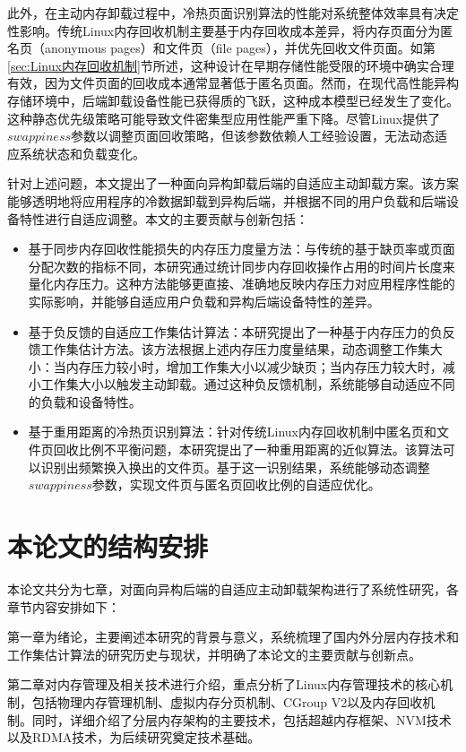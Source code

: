 此外，在主动内存卸载过程中，冷热页面识别算法的性能对系统整体效率具有决定性影响。传统Linux内存回收机制主要基于内存回收成本差异，将内存页面分为匿名页（anonymous pages）和文件页（file pages），并优先回收文件页面。如第\ref{sec:Linux内存回收机制}节所述，这种设计在早期存储性能受限的环境中确实合理有效，因为文件页面的回收成本通常显著低于匿名页面。然而，在现代高性能异构存储环境中，后端卸载设备性能已获得质的飞跃，这种成本模型已经发生了变化。这种静态优先级策略可能导致文件密集型应用性能严重下降。尽管Linux提供了\(swappiness\)参数以调整页面回收策略，但该参数依赖人工经验设置，无法动态适应系统状态和负载变化。

针对上述问题，本文提出了一种面向异构卸载后端的自适应主动卸载方案。该方案能够透明地将应用程序的冷数据卸载到异构后端，并根据不同的用户负载和后端设备特性进行自适应调整。本文的主要贡献与创新包括：

\begin{itemize}
    \item 基于同步内存回收性能损失的内存压力度量方法：与传统的基于缺页率或页面分配次数的指标不同，本研究通过统计同步内存回收操作占用的时间片长度来量化内存压力。这种方法能够更直接、准确地反映内存压力对应用程序性能的实际影响，并能够自适应用户负载和异构后端设备特性的差异。
    \item 基于负反馈的自适应工作集估计算法：本研究提出了一种基于内存压力的负反馈工作集估计方法。该方法根据上述内存压力度量结果，动态调整工作集大小：当内存压力较小时，增加工作集大小以减少缺页；当内存压力较大时，减小工作集大小以触发主动卸载。通过这种负反馈机制，系统能够自动适应不同的负载和设备特性。
    \item 基于重用距离的冷热页识别算法：针对传统Linux内存回收机制中匿名页和文件页回收比例不平衡问题，本研究提出了一种重用距离的近似算法。该算法可以识别出频繁换入换出的文件页。基于这一识别结果，系统能够动态调整\(swappiness\)参数，实现文件页与匿名页回收比例的自适应优化。
\end{itemize}

\section{本论文的结构安排}

本论文共分为七章，对面向异构后端的自适应主动卸载架构进行了系统性研究，各章节内容安排如下：

第一章为绪论，主要阐述本研究的背景与意义，系统梳理了国内外分层内存技术和工作集估计算法的研究历史与现状，并明确了本论文的主要贡献与创新点。

第二章对内存管理及相关技术进行介绍，重点分析了Linux内存管理技术的核心机制，包括物理内存管理机制、虚拟内存分页机制、CGroup V2以及内存回收机制。同时，详细介绍了分层内存架构的主要技术，包括超越内存框架、NVM技术以及RDMA技术，为后续研究奠定技术基础。

